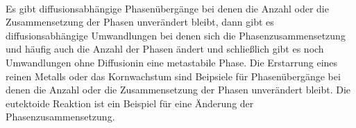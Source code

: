 \documentclass[11pt,a4paper]{article}
\numberwithin{equation}{section}
\numberwithin{figure}{section}
\begin{document}
\\
\begin{addmargin}[25pt]{0pt}
Es gibt diffusionsabhängige Phasenübergänge bei denen die Anzahl oder die Zusammensetzung der Phasen unverändert bleibt, dann gibt es diffusionsabhängige Umwandlungen bei denen sich die Phasenzusammensetzung und häufig auch die Anzahl der Phasen ändert und schließlich gibt es noch Umwandlungen ohne Diffusionin eine metastabile Phase. Die Erstarrung eines reinen Metalls oder das Kornwachstum sind Beipsiele für Phasenübergänge bei denen die Anzahl oder die Zusammensetzung der Phasen unverändert bleibt. Die eutektoide Reaktion ist ein Beispiel für eine Änderung der Phasenzusammensetzung.\\
\end{addmargin}
\end{document}
